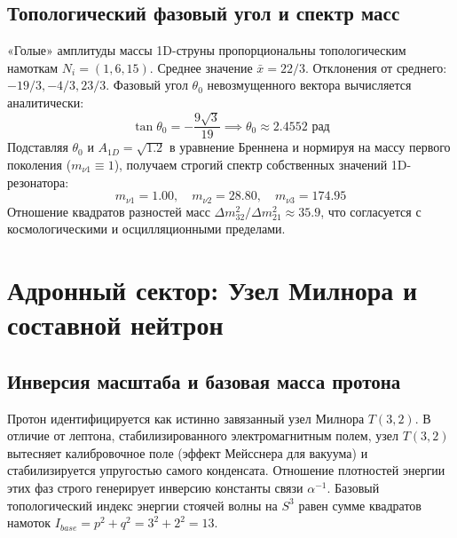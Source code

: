 \documentclass[12pt,a4paper]{article}
\begin{document}
	\subsection{Топологический фазовый угол и спектр масс}
	«Голые» амплитуды массы 1D-струны пропорциональны топологическим намоткам $N_i = (1, 6, 15)$. Среднее значение $\bar{x} = 22/3$. Отклонения от среднего: $-19/3, -4/3, 23/3$.
	Фазовый угол $\theta_0$ невозмущенного вектора вычисляется аналитически:
	\begin{equation}
		\tan\theta_0 = -\frac{9\sqrt{3}}{19} \implies \theta_0 \approx 2.4552 \text{ рад}
	\end{equation}
	Подставляя $\theta_0$ и $A_{1D} = \sqrt{1.2}$ в уравнение Бреннена и нормируя на массу первого поколения ($m_{\nu 1} \equiv 1$), получаем строгий спектр собственных значений 1D-резонатора:
	\begin{equation}
		m_{\nu 1} = \mathbf{1.00}, \quad m_{\nu 2} = \mathbf{28.80}, \quad m_{\nu 3} = \mathbf{174.95}
	\end{equation}
	Отношение квадратов разностей масс $\Delta m_{32}^2 / \Delta m_{21}^2 \approx 35.9$, что согласуется с космологическими и осцилляционными пределами.
	
	\section{Адронный сектор: Узел Милнора и составной нейтрон}
	
	\subsection{Инверсия масштаба и базовая масса протона}
	Протон идентифицируется как истинно завязанный узел Милнора $T(3,2)$. В отличие от лептона, стабилизированного электромагнитным полем, узел $T(3,2)$ вытесняет калибровочное поле (эффект Мейсснера для вакуума) и стабилизируется упругостью самого конденсата. Отношение плотностей энергии этих фаз строго генерирует инверсию константы связи $\alpha^{-1}$.
	Базовый топологический индекс энергии стоячей волны на $S^3$ равен сумме квадратов намоток $I_{base} = p^2 + q^2 = 3^2 + 2^2 = 13$.
	
\end{document}
